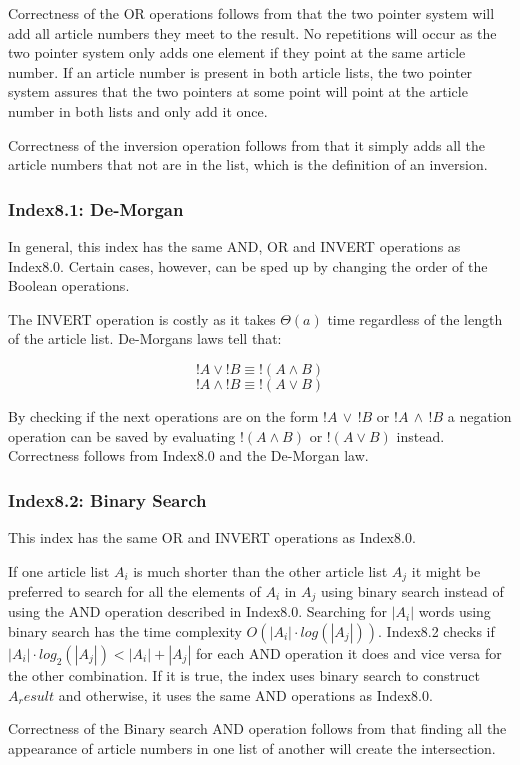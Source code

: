 Correctness of the OR operations follows from that the two pointer system will add all article numbers they meet to the result. No repetitions will occur as the two pointer system only adds one element if they point at the same article number. If an article number is present in both article lists, the two pointer system assures that the two pointers at some point will point at the article number in both lists and only add it once.

Correctness of the inversion operation follows from that it simply adds all the article numbers that not are in the list, which is the definition of an inversion.

\subsubsection{Index8.1: De-Morgan}
In general, this index has the same AND, OR and INVERT operations as Index8.0. Certain cases, however, can be sped up by changing the order of the Boolean operations.

The INVERT operation is costly as it takes $\Theta(a)$ time regardless of the length of the article list. De-Morgans laws tell that:

$$!A \vee ! B \equiv !(A \wedge B)$$
$$!A \wedge ! B \equiv !(A \vee B)$$

By checking if the next operations are on the form $!A\, \vee\, !B$ or $!A\, \wedge\, ! B$ a negation operation can be saved by evaluating $!(A \wedge B)$ or $!(A \vee B)$ instead. Correctness follows from Index8.0 and the De-Morgan law.

\subsubsection{Index8.2: Binary Search}
This index has the same OR and INVERT operations as Index8.0.

If one article list $A_i$ is much shorter than the other article list $A_j$ it might be preferred to search for all the elements of $A_i$ in $A_j$ using binary search instead of using the AND operation described in Index8.0. Searching for $|A_i|$ words using binary search has the time complexity $O(|A_i| \cdot log(|A_j|))$. Index8.2 checks if $|A_i| \cdot log_2(|A_j|) < |A_i| + |A_j|$ for each AND operation it does and vice versa for the other combination. If it is true, the index uses binary search to construct $A_result$ and otherwise, it uses the same AND operations as Index8.0. 

Correctness of the Binary search AND operation follows from that finding all the appearance of article numbers in one list of another will create the intersection.

